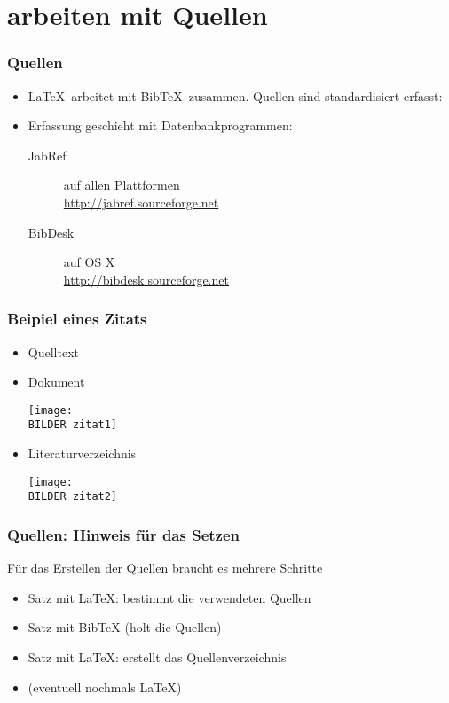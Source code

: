 \documentclass[11pt,german]{beamer}
\def\myColor{blue!80!white!70!green}                %
\newcommand{\thisColor}[1]{{\color{\myColor}#1}}    %
\def\BILDER{../Bilder/} %
\begin{document}
\section{arbeiten mit Quellen}
\frame
{
	\frametitle{Quellen}
	\begin{itemize}
		\item \LaTeX\ arbeitet mit \thisColor{BibTeX}\ zusammen. Quellen sind standardisiert erfasst:
	
	\item Erfassung geschieht mit Datenbankprogrammen:
		\begin{description}
			\item[JabRef] auf allen Plattformen \\
			
		\url{http://jabref.sourceforge.net}
			\item[BibDesk] auf OS X	\\ \url{http://bibdesk.sourceforge.net}		
		\end{description}
	\end{itemize}
	
}
\frame
{
	\frametitle{Beipiel eines Zitats}
	\begin{itemize}
		\item Quelltext \\
			
		\item Dokument \\
		 	\begin{center}
		 \texttt{[image: \\BILDER zitat1]}
		 \end{center}
		\item Literaturverzeichnis \\
		 	\begin{center}
		 \texttt{[image: \\BILDER zitat2]}
		 
		 	\end{center}
		
		
	\end{itemize}
}
\frame
{
	\frametitle{Quellen: Hinweis für das Setzen}
	
	Für das Erstellen der Quellen braucht es mehrere Schritte
	\begin{itemize}
		\item Satz mit \thisColor{\LaTeX}: bestimmt die verwendeten Quellen
		\item Satz mit \thisColor{BibTeX} (holt die Quellen)
		\item Satz mit \thisColor{\LaTeX}: erstellt das Quellenverzeichnis
		\item (eventuell nochmals \thisColor{\LaTeX})
		
	\end{itemize}
}
\end{document}
